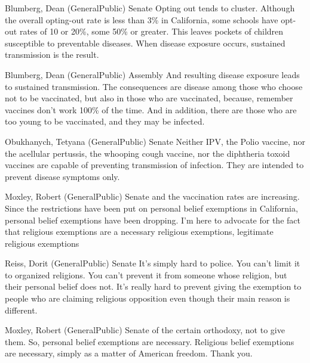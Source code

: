 \begin{result}{26.31935187011756}{Blumberg, Dean (GeneralPublic) Senate}
Opting out tends to cluster. Although the overall opting-out rate is less than 3\% in California, some schools have opt-out rates of 10 or 20\%, some 50\% or greater. This leaves pockets of children susceptible to preventable diseases. When disease exposure occurs, sustained transmission is the result.
\end{result}

\begin{result}{17.518612732526}{Blumberg, Dean (GeneralPublic) Assembly}
And resulting disease exposure leads to sustained transmission. The consequences are disease among those who choose not to be vaccinated, but also in those who are vaccinated, because, remember vaccines don't work 100\% of the time. And in addition, there are those who are too young to be vaccinated, and they may be infected.
\end{result}

\begin{result}{12.956579423132006}{Obukhanych, Tetyana (GeneralPublic) Senate}
Neither IPV, the Polio vaccine, nor the acellular pertussis, the whooping cough vaccine, nor the diphtheria toxoid vaccines are capable of preventing transmission of infection. They are intended to prevent disease symptoms only.
\end{result}

\begin{result}{12.287787065500698}{Moxley, Robert (GeneralPublic) Senate}
and the vaccination rates are increasing. Since the restrictions have been put on personal belief exemptions in California, personal belief exemptions have been dropping. I'm here to advocate for the fact that religious exemptions are a necessary religious exemptions, legitimate religious exemptions
\end{result}

\begin{result}{12.208991478716925}{Reiss, Dorit (GeneralPublic) Senate}
It's simply hard to police. You can't limit it to organized religions. You can't prevent it from someone whose religion, but their personal belief does not. It's really hard to prevent giving the exemption to people who are claiming religious opposition even though their main reason is different.
\end{result}

\begin{result}{11.93689502985251}{Moxley, Robert (GeneralPublic) Senate}
of the certain orthodoxy, not to give them. So, personal belief exemptions are necessary. Religious belief exemptions are necessary, simply as a matter of American freedom. Thank you.
\end{result}

